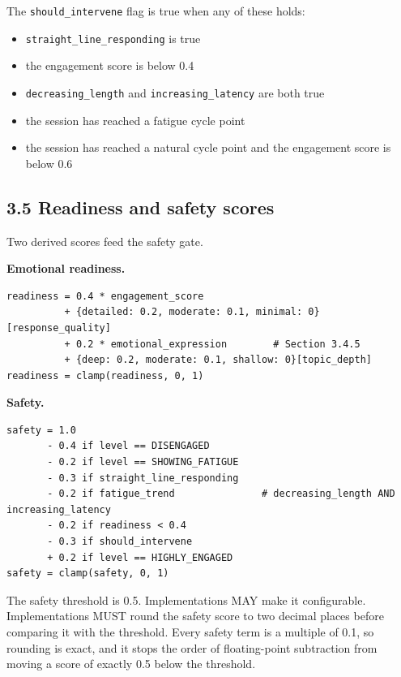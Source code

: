 \documentclass[11pt]{article}
\providecommand{\tightlist}{\setlength{\itemsep}{0pt}\setlength{\parskip}{0pt}}
\begin{document}
The \texttt{should\_\allowbreak{}intervene} flag is true when any of these holds:

\begin{itemize}
\tightlist
\item
  \texttt{straight\_\allowbreak{}line\_\allowbreak{}responding} is true
\item
  the engagement score is below 0.4
\item
  \texttt{decreasing\_\allowbreak{}length} and \texttt{increasing\_\allowbreak{}latency} are both
  true
\item
  the session has reached a fatigue cycle point
\item
  the session has reached a natural cycle point and the engagement score
  is below 0.6
\end{itemize}

\subsection{3.5 Readiness and safety scores}

Two derived scores feed the safety gate.

\textbf{Emotional readiness.}

\begin{verbatim}
readiness = 0.4 * engagement_score
          + {detailed: 0.2, moderate: 0.1, minimal: 0}[response_quality]
          + 0.2 * emotional_expression        # Section 3.4.5
          + {deep: 0.2, moderate: 0.1, shallow: 0}[topic_depth]
readiness = clamp(readiness, 0, 1)
\end{verbatim}

\textbf{Safety.}

\begin{verbatim}
safety = 1.0
       - 0.4 if level == DISENGAGED
       - 0.2 if level == SHOWING_FATIGUE
       - 0.3 if straight_line_responding
       - 0.2 if fatigue_trend               # decreasing_length AND increasing_latency
       - 0.2 if readiness < 0.4
       - 0.3 if should_intervene
       + 0.2 if level == HIGHLY_ENGAGED
safety = clamp(safety, 0, 1)
\end{verbatim}

The safety threshold is 0.5. Implementations MAY make it configurable.
Implementations MUST round the safety score to two decimal places before
comparing it with the threshold. Every safety term is a multiple of 0.1,
so rounding is exact, and it stops the order of floating-point
subtraction from moving a score of exactly 0.5 below the threshold.
\end{document}
